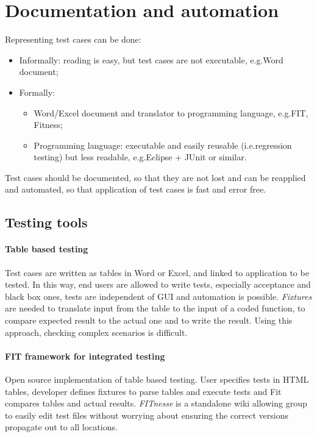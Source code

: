 \section{Documentation and automation}
Representing test cases can be done:
\begin{itemize}
\item Informally: reading is easy, but test cases are not executable, e.g.\@ Word document;
\item Formally:
\begin{itemize}
\item Word/Excel document and translator to programming language, e.g.\@ FIT, Fitness;
\item Programming language: executable and easily reusable (i.e.\@ regression testing) but less readable, e.g.\@ Eclipse + JUnit or similar.
\end{itemize}
\end{itemize}

Test cases should be documented, so that they are not lost and can be reapplied and automated, so that application of test cases is fast and error free.

\subsection{Testing tools}
\paragraph{Table based testing}
Test cases are written as tables in Word or Excel, and linked to application to be tested. In this way, end users are allowed to write tests, especially acceptance and black box ones, tests are independent of GUI and automation is possible. \emph{Fixtures} are needed to translate input from the table to the input of a coded function, to compare expected result to the actual one and to write the result. Using this approach, checking complex scenarios is difficult.

\paragraph{FIT framework for integrated testing}
Open source implementation of table based testing. User specifies tests in HTML tables, developer defines fixtures to parse tables and execute tests and Fit compares tables and actual results. \emph{FITnesse} is a standalone wiki allowing group to easily edit test files without worrying about ensuring the correct versions propagate out to all locations.

